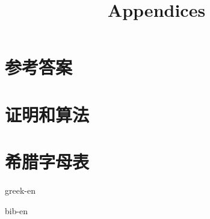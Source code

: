 \documentclass[b5paper]{article}
\begin{document}
\title{Appendices}

\maketitle
\fi


\chapter{参考答案}
\label{ch:answers}
\shipoutAnswer

\chapter{证明和算法}


\chapter{希腊字母表} \label{ch:greek-letters}
{greek-en}

\markboth{\bibname}{}

\begin{thebibliography}{99}
  {bib-en}
\end{thebibliography}

\ifx\wholebook\relax \else
\expandafter\enddocument
\fi
\end{document}
